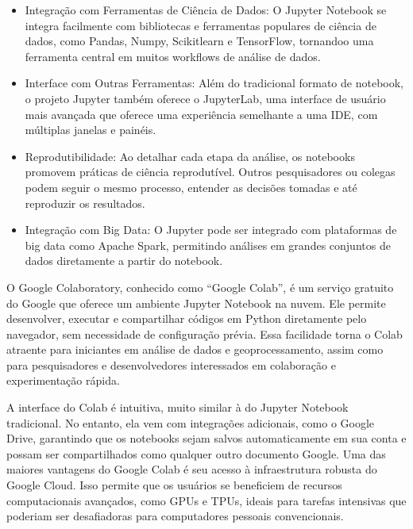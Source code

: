 \documentclass[letterpaper,10pt,english]{jupyterBook}
\begin{document}
\begin{itemize}
\item {} 
\sphinxAtStartPar
Integração com Ferramentas de Ciência de Dados: O Jupyter Notebook se integra facilmente com bibliotecas e ferramentas populares de ciência de dados, como Pandas, Numpy, Scikit\sphinxhyphen{}learn e TensorFlow, tornando\sphinxhyphen{}o uma ferramenta central em muitos workflows de análise de dados.

\item {} 
\sphinxAtStartPar
Interface com Outras Ferramentas: Além do tradicional formato de notebook, o projeto Jupyter também oferece o JupyterLab, uma interface de usuário mais avançada que oferece uma experiência semelhante a uma IDE, com múltiplas janelas e painéis.

\item {} 
\sphinxAtStartPar
Reprodutibilidade: Ao detalhar cada etapa da análise, os notebooks promovem práticas de ciência reprodutível. Outros pesquisadores ou colegas podem seguir o mesmo processo, entender as decisões tomadas e até reproduzir os resultados.

\item {} 
\sphinxAtStartPar
Integração com Big Data: O Jupyter pode ser integrado com plataformas de big data como Apache Spark, permitindo análises em grandes conjuntos de dados diretamente a partir do notebook.

\end{itemize}

\sphinxAtStartPar
{}

\sphinxAtStartPar
O Google Colaboratory, conhecido como “Google Colab”, é um serviço gratuito do Google que oferece um ambiente Jupyter Notebook na nuvem. Ele permite desenvolver, executar e compartilhar códigos em Python diretamente pelo navegador, sem necessidade de configuração prévia. Essa facilidade torna o Colab atraente para iniciantes em análise de dados e geoprocessamento, assim como para pesquisadores e desenvolvedores interessados em colaboração e experimentação rápida.

\sphinxAtStartPar
A interface do Colab é intuitiva, muito similar à do Jupyter Notebook tradicional. No entanto, ela vem com integrações adicionais, como o Google Drive, garantindo que os notebooks sejam salvos automaticamente em sua conta e possam ser compartilhados como qualquer outro documento Google.
Uma das maiores vantagens do Google Colab é seu acesso à infraestrutura robusta do Google Cloud. Isso permite que os usuários se beneficiem de recursos computacionais avançados, como GPUs e TPUs, ideais para tarefas intensivas que poderiam ser desafiadoras para computadores pessoais convencionais.
\end{document}
